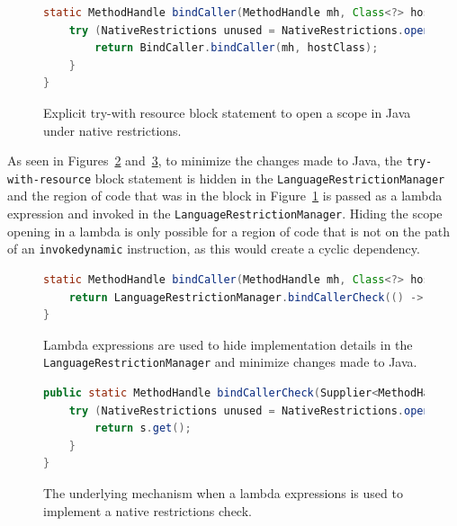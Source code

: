 \begin{figure}[ht]
    \centering
\begin{lstlisting}[language=Java]
static MethodHandle bindCaller(MethodHandle mh, Class<?> hostClass) {
    try (NativeRestrictions unused = NativeRestrictions.openScope()) {
        return BindCaller.bindCaller(mh, hostClass);
    }
}
\end{lstlisting}
    \caption{Explicit try-with resource block statement to open a scope in Java under native restrictions.}
    \label{fig:bind_caller_twr}
\end{figure}

As seen in Figures~\ref{fig:bind_caller_lambda} and~\ref{fig:bind_caller_lrm}, to minimize the changes made to Java, the \verb|try-with-resource| block statement is hidden in the \verb|LanguageRestrictionManager| and the region of code that was in the block in Figure~\ref{fig:bind_caller_twr} is passed as a lambda expression and invoked in the \verb|LanguageRestrictionManager|. Hiding the scope opening in a lambda is only possible for a region of code that is not on the path of an \verb|invokedynamic| instruction, as this would create a cyclic dependency. 

\begin{figure}[ht]
    \centering
\begin{lstlisting}[language=Java]
static MethodHandle bindCaller(MethodHandle mh, Class<?> hostClass) {
    return LanguageRestrictionManager.bindCallerCheck(() -> BindCaller.bindCaller(mh, hostClass));
}
\end{lstlisting}
    \caption{Lambda expressions are used to hide implementation details in the \texttt{LanguageRestrictionManager} and minimize changes made to Java.}
    \label{fig:bind_caller_lambda}
\end{figure}

\begin{figure}[ht]
    \centering
\begin{lstlisting}[language=Java]
public static MethodHandle bindCallerCheck(Supplier<MethodHandle> s) {
    try (NativeRestrictions unused = NativeRestrictions.openScope()) {
        return s.get();
    }
}
\end{lstlisting}
    \caption{The underlying mechanism when a lambda expressions is used to implement a native restrictions check.}
    \label{fig:bind_caller_lrm}
\end{figure}


